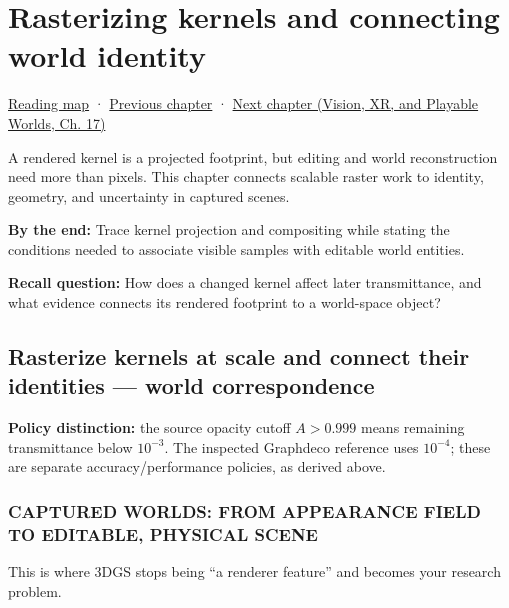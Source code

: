 \chapter{Rasterizing kernels and connecting world identity}\label{06-engine-ii-ch045-rasterizing-kernels-and-connecting-world-identity}\hypertarget{06-engine-ii-ch045}{}\label{stagechapter:06-engine-ii-ch045}

\hyperref[volume-reading-map]{Reading map} · \hyperref[06-engine-ii-ch044-cross-backend-conversion-and-agreement]{Previous chapter} · \href{../07-Vision-XR-and-Playable-Worlds/main.pdf\#nameddest=06-engine-ii-ch046-game-design-from-mechanics-to-narrative-interfaces}{Next chapter (Vision, XR, and Playable Worlds, Ch. 17)}

A rendered kernel is a projected footprint, but editing and world reconstruction need more than pixels. This chapter connects scalable raster work to identity, geometry, and uncertainty in captured scenes.

\textbf{By the end:} Trace kernel projection and compositing while stating the conditions needed to associate visible samples with editable world entities.

\textbf{Recall question:} How does a changed kernel affect later transmittance, and what evidence connects its rendered footprint to a world-space object?

\section{Rasterize kernels at scale and connect their identities --- world correspondence}\label{06-engine-ii-ch045-rasterize-kernels-at-scale-and-connect-their-identities-world-correspondence}

\textbf{Policy distinction:} the source opacity cutoff \(A>0.999\) means remaining transmittance below \(10^{-3}\). The inspected Graphdeco reference uses \(10^{-4}\); these are separate accuracy/performance policies, as derived above.

\subsection{CAPTURED WORLDS: FROM APPEARANCE FIELD TO EDITABLE, PHYSICAL SCENE}\label{06-engine-ii-ch045-captured-worlds-from-appearance-field-to-editable-physical-scene}

This is where 3DGS stops being ``a renderer feature'' and becomes your research problem.


